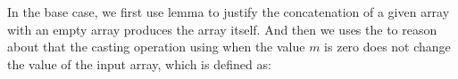\documentclass{l4proj}
\begin{document}
In the base case, we first use lemma \AgdaFunction{++-[]} to justify the concatenation of a given array with an empty array produces the array itself. And then we uses the  to reason about that the casting operation using  when the value $m$ is zero does not change the value of the input array, which is defined as:
\begin{code}%
\>[0]\AgdaSpace{}%
\AgdaSymbol{:}%
\>[149I]\AgdaSymbol{\{}\AgdaSpace{}%
\AgdaSpace{}%
\AgdaSpace{}%
\AgdaSymbol{:}\AgdaSpace{}%
\AgdaSymbol{\}}\AgdaSpace{}%
\AgdaSpace{}%
\AgdaSymbol{\{}\AgdaSpace{}%
\AgdaSymbol{:}\AgdaSpace{}%
\AgdaSymbol{\}}\AgdaSpace{}%
\AgdaSpace{}%
\AgdaSymbol{(}\AgdaSpace{}%
\AgdaSymbol{:}\AgdaSpace{}%
\AgdaSpace{}%
\AgdaSpace{}%
\AgdaSymbol{(}\AgdaSpace{}%
\AgdaOperator{\AgdaPrimitive{+}}\AgdaSpace{}%
\AgdaSpace{}%
\AgdaOperator{\AgdaPrimitive{*}}\AgdaSpace{}%
\AgdaSpace{}%
\AgdaSymbol{))}\AgdaSpace{}%
\<%
\\
\>[.][@{}l@{}]\<[149I]%
\>[7]\AgdaSpace{}%
\AgdaSpace{}%
\AgdaSpace{}%
\AgdaSymbol{(}\AgdaSpace{}%
\AgdaSpace{}%
\AgdaSpace{}%
\AgdaSpace{}%
\AgdaSymbol{)}\AgdaSpace{}%
\<%
\\
\>[0]\AgdaSpace{}%
\AgdaSymbol{\{}\AgdaSymbol{\}}\AgdaSpace{}%
\AgdaSymbol{\{}\AgdaSymbol{\}}\AgdaSpace{}%
\AgdaSymbol{\{}\AgdaSymbol{\}}\AgdaSpace{}%
\AgdaInductiveConstructor{[]}\AgdaSpace{}%
\AgdaSymbol{=}\AgdaSpace{}%
\<%
\\
\>[0]\AgdaSpace{}%
\AgdaSymbol{\{}\AgdaSymbol{\}}\AgdaSpace{}%
\AgdaSymbol{\{}\AgdaSpace{}%
\AgdaSymbol{\}}\AgdaSpace{}%
\AgdaSymbol{\{}\AgdaSymbol{\}}\AgdaSpace{}%
\AgdaSymbol{(}\AgdaSpace{}%
\AgdaSpace{}%
\AgdaSymbol{)}\AgdaSpace{}%
\AgdaSymbol{=}\AgdaSpace{}%
\AgdaSpace{}%
\AgdaSymbol{(}\AgdaSpace{}%
\AgdaSymbol{)}\AgdaSpace{}%

\end{code}
\end{document}
